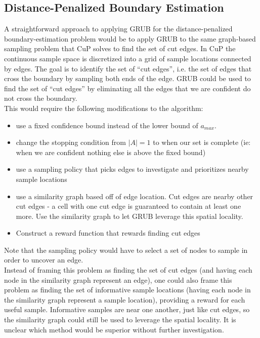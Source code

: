 \documentclass{article}[12pt]
\begin{document}
\subsection{Distance-Penalized Boundary Estimation}

A straightforward approach to applying GRUB for the distance-penalized boundary-estimation problem would be to apply GRUB to the same graph-based sampling problem that CuP solves to find the set of cut edges.
In CuP the continuous sample space is discretized into a grid of sample locations connected by edges.
The goal is to identify the set of ``cut edges'', i.e. the set of edges that cross the boundary by sampling both ends of the edge.
GRUB could be used to find the set of ``cut edges'' by eliminating all the edges that we are confident do not cross the boundary. \\

This would require the following modifications to the algorithm:
\begin{itemize}
    \item use a fixed confidence bound instead of the lower bound of $a_{max}$.
    \item change the stopping condition from $|A|=1$ to when our set is complete (ie: when we are confident nothing else is above the fixed bound)
    \item use a sampling policy that picks edges to investigate and prioritizes nearby sample locations
    \item use a similarity graph based off of edge location. Cut edges are nearby other cut edges - a cell with one cut edge is guaranteed to contain at least one more.
    Use the similarity graph to let GRUB leverage this spatial locality.
    \item Construct a reward function that rewards finding cut edges
\end{itemize}

Note that the sampling policy would have to select a set of nodes to sample in order to uncover an edge. \\

Instead of framing this problem as finding the set of cut edges (and having each node in the similarity graph represent an edge),
one could also frame this problem as finding the set of informative sample locations (having each node in the similarity graph represent a sample location), providing a reward for each useful sample.
Informative samples are near one another, just like cut edges, so the similarity graph could still be used to leverage the spatial locality.
It is unclear which method would be superior without further investigation.
\end{document}
